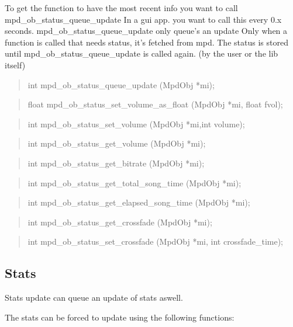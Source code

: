 \documentclass[a4paper,11pt]{article}
\begin{document}
To get the function to have the  most recent info you want to call mpd\_ob\_status\_queue\_update 
In a gui app. you want to call this every 0.x seconds. 
mpd\_ob\_status\_queue\_update only queue's an update
Only when a function is called that needs status, it's fetched from mpd.
The status is stored until mpd\_ob\_status\_queue\_update is called again. (by the user or the lib itself)

\begin{quote}
int 		mpd\_ob\_status\_queue\_update		(MpdObj *mi);
\end{quote}

\begin{quote}
float 		mpd\_ob\_status\_set\_volume\_as\_float	(MpdObj *mi, float fvol);
\end{quote}

\begin{quote}
int 		mpd\_ob\_status\_set\_volume		(MpdObj *mi,int volume);
\end{quote}

\begin{quote}
int 		mpd\_ob\_status\_get\_volume		(MpdObj *mi);
\end{quote}

\begin{quote}
int 		mpd\_ob\_status\_get\_bitrate		(MpdObj *mi);
\end{quote}

\begin{quote}
int		mpd\_ob\_status\_get\_total\_song\_time	(MpdObj *mi);
\end{quote}

\begin{quote}
int		mpd\_ob\_status\_get\_elapsed\_song\_time	(MpdObj *mi);
\end{quote}

\begin{quote}
int		mpd\_ob\_status\_get\_crossfade		(MpdObj *mi);
\end{quote}

\begin{quote}
int		mpd\_ob\_status\_set\_crossfade		(MpdObj *mi, int crossfade\_time);
\end{quote}

\subsection {Stats}


Stats update can queue an update of stats aswell.

The stats can be forced to update using the following functions:
\end{document}
